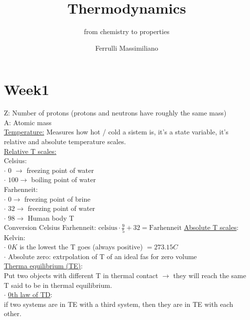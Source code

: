 \documentclass[a4paper,11pt]{article}
\begin{document}
\title{Thermodynamics}
\subtitle{from chemistry to properties}
\author{Ferrulli Massimiliano}  

\maketitle





\tableofcontents





\pagebreak



\section{Week1}
Z: Number of protons (protons and neutrons have roughly the same mass)\\
A: Atomic mass \\
\underline{Temperature:} Measures how hot / cold a sistem is, it's a state variable, it's relative and absolute temperature scales. \\
 \underline{Relative T scales:}\\
 Celsius: \\
 $\cdot$ 0  $\to$  freezing point of water \\
 $\cdot$ $ 100 \to $ boiling point of water \\
Farhenneit: \\
$\cdot$ $ 0 \to $ freezing point of brine \\
$\cdot$ $ 32 \to $ freezing point of water \\
$\cdot$ $ 98 \to $ Human body T \\
Conversion Celsius Farhenneit: 
$  \text{celsius} \cdot \frac{9}{5}  + 32 = \text{Farhenneit} $
\underline{ Absolute T scales}: \\
 Kelvin: \\
 $\cdot$ $ 0K $ is the lowest the T goes (always positive) $ = 273.15 C $  \\
 $\cdot$ Absolute zero: extrpolation of T of an ideal fas for zero volume \\
\underline{Therma equilibrium (TE)}: \\
Put two objects with different T in thermal contact $\to$ they will reach the same T said to be in thermal equilibrium. \\
$\cdot$ \underline{0th law of TD}: \\
if two systems are in TE with a third system, then they are in TE with each other. 
\end{document}
